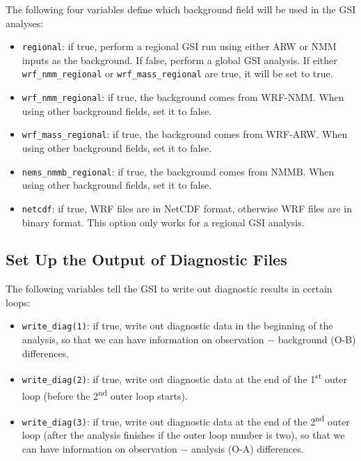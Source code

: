 The following four variables define which background field will be used in the GSI analyses:

\begin{itemize}
\item \verb|regional|: if true, perform a regional GSI run using either ARW or NMM inputs as the background. If false, perform a global GSI analysis. If either \verb|wrf_nmm_regional| or \verb|wrf_mass_regional| are true, it will be set to true.
\item \verb|wrf_nmm_regional|: if true, the background comes from WRF-NMM. When using other background fields, set it to false. 
\item \verb|wrf_mass_regional|: if true, the background comes from WRF-ARW. When using other background fields, set it to false. 
\item \verb|nems_nmmb_regional|: if true, the background comes from NMMB. When using other background fields, set it to false.
\item \verb|netcdf|: if true, WRF files are in NetCDF format, otherwise WRF files are in binary format. This option only works for a regional GSI analysis.
\end{itemize}

\subsection{Set Up the Output of Diagnostic Files}

The following variables tell the GSI to write out diagnostic results in certain loops:

\begin{itemize}
\item \verb|write_diag(1)|: if true, write out diagnostic data in the beginning of the analysis, so that we can have information on observation $-$ background (O-B) differences.
\item \verb|write_diag(2)|: if true, write out diagnostic data at the end of the 1\textsuperscript{st} outer loop (before the 2\textsuperscript{nd} outer loop starts).
\item \verb|write_diag(3)|: if true, write out diagnostic data at the end of the 2\textsuperscript{nd} outer loop (after the analysis finishes if the outer loop number is two), so that we can have information on observation $-$ analysis (O-A) differences. 
\end{itemize}


